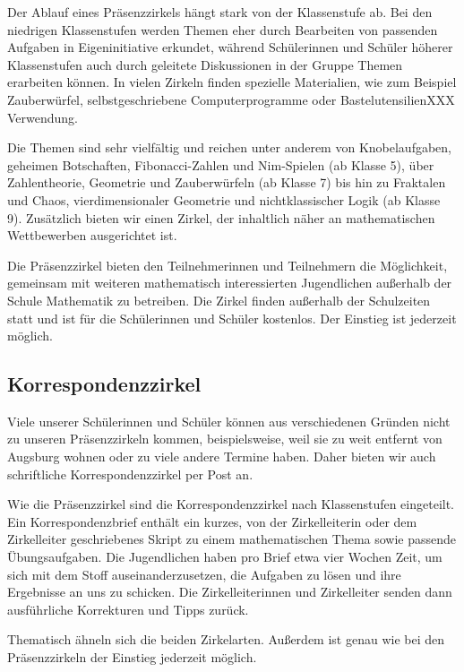 \documentclass[12pt]{zettel}
\begin{document}
Der Ablauf eines Präsenzzirkels hängt stark von der Klassenstufe ab. Bei den
niedrigen Klassenstufen werden Themen eher durch Bearbeiten von passenden
Aufgaben in Eigeninitiative erkundet, während Schülerinnen und Schüler höherer
Klassenstufen auch durch geleitete Diskussionen in der Gruppe
Themen erarbeiten können. In vielen Zirkeln finden spezielle Materialien,
wie zum Beispiel Zauberwürfel, selbstgeschriebene Computerprogramme oder
BastelutensilienXXX Verwendung.

Die Themen sind sehr vielfältig und reichen unter anderem von
Knobelaufgaben, geheimen Botschaften, Fibonacci-Zahlen und Nim-Spielen (ab Klasse 5),
über Zahlentheorie, Geometrie und Zauberwürfeln (ab Klasse 7) bis hin zu
Fraktalen und Chaos, vierdimensionaler Geometrie und nichtklassischer Logik
(ab Klasse 9). Zusätzlich bieten wir einen Zirkel, der inhaltlich näher an
mathematischen Wettbewerben ausgerichtet ist.

Die Präsenzzirkel bieten den Teilnehmerinnen und Teilnehmern die Möglichkeit,
gemeinsam mit weiteren mathematisch interessierten Jugendlichen außerhalb der
Schule Mathematik zu betreiben. Die Zirkel finden außerhalb der Schulzeiten
statt und ist für die Schülerinnen und Schüler kostenlos. Der Einstieg ist
jederzeit möglich.


\subsection{Korrespondenzzirkel}

Viele unserer Schülerinnen und Schüler können aus verschiedenen Gründen
nicht zu unseren Präsenzzirkeln kommen, beispielsweise, weil sie zu weit
entfernt von Augsburg wohnen oder zu viele andere Termine haben.
Daher bieten wir auch schriftliche Korrespondenzzirkel per Post
an.

Wie die Präsenzzirkel sind die Korrespondenzzirkel nach Klassenstufen eingeteilt. Ein
Korrespondenzbrief enthält ein kurzes, von der Zirkelleiterin oder dem
Zirkelleiter geschriebenes Skript zu einem mathematischen Thema sowie passende
Übungsaufgaben. Die Jugendlichen haben pro Brief etwa vier Wochen Zeit, um sich
mit dem Stoff auseinanderzusetzen, die Aufgaben zu lösen und ihre Ergebnisse
an uns zu schicken. Die Zirkelleiterinnen und Zirkelleiter senden dann
ausführliche Korrekturen und Tipps zurück.

Thematisch ähneln sich die beiden Zirkelarten. Außerdem ist genau wie bei den
Präsenzzirkeln der Einstieg jederzeit möglich.
\end{document}
